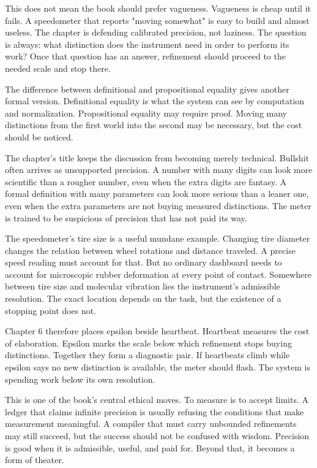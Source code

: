 This does not mean the book should prefer vagueness. Vagueness is cheap until
it fails. A speedometer that reports "moving somewhat" is easy to build and
almost useless. The chapter is defending calibrated precision, not laziness.
The question is always: what distinction does the instrument need in order to
perform its work? Once that question has an answer, refinement should proceed
to the needed scale and stop there.

The difference between definitional and propositional equality gives another
formal version. Definitional equality is what the system can see by computation
and normalization. Propositional equality may require proof. Moving many
distinctions from the first world into the second may be necessary, but the
cost should be noticed.

The chapter's title keeps the discussion from becoming merely technical.
Bullshit often arrives as unsupported precision. A number with many digits can
look more scientific than a rougher number, even when the extra digits are
fantasy. A formal definition with many parameters can look more serious than a
leaner one, even when the extra parameters are not buying measured
distinctions. The meter is trained to be suspicious of precision that has not
paid its way.

The speedometer's tire size is a useful mundane example. Changing tire diameter
changes the relation between wheel rotations and distance traveled. A precise
speed reading must account for that. But no ordinary dashboard needs to account
for microscopic rubber deformation at every point of contact. Somewhere between
tire size and molecular vibration lies the instrument's admissible resolution.
The exact location depends on the task, but the existence of a stopping point
does not.

Chapter 6 therefore places epsilon beside heartbeat. Heartbeat measures the
cost of elaboration. Epsilon marks the scale below which refinement stops
buying distinctions. Together they form a diagnostic pair. If heartbeats climb
while epsilon says no new distinction is available, the meter should flash. The
system is spending work below its own resolution.

This is one of the book's central ethical moves. To measure is to accept
limits. A ledger that claims infinite precision is usually refusing the
conditions that make measurement meaningful. A compiler that must carry
unbounded refinements may still succeed, but the success should not be
confused with wisdom. Precision is good when it is admissible, useful, and
paid for. Beyond that, it becomes a form of theater.

